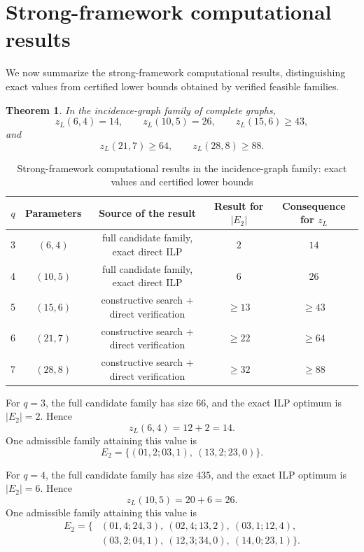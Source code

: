 \documentclass[10pt]{article}
\newcommand{\blue}[1]{#1}
\newcommand{\0}{\mathbf{0}}
\newcommand{\1}{\mathbf{1}}
\newtheorem{Thm}{Theorem}[section]
\begin{document}
\section{Strong-framework computational results}

\blue{We now summarize the strong-framework computational results, distinguishing exact values from certified lower bounds obtained by verified feasible families.}

\begin{Thm}
In the incidence-graph family of complete graphs,
\[
z_L(6,4)=14,\qquad z_L(10,5)=26,\qquad z_L(15,6)\ge 43,
\]
and
\[
z_L(21,7)\ge 64,\qquad z_L(28,8)\ge 88.
\]
\end{Thm}

\begin{table}[htbp]
\centering
\caption{Strong-framework computational results in the incidence-graph family: exact values and certified lower bounds}
\label{tab:smallq}
\begin{tabular}{|c|c|c|c|c|}
\hline
\(q\) & Parameters & Source of the result & Result for \(|E_2|\) & Consequence for \(z_L\) \\ \hline
3 & \((6,4)\) & full candidate family, exact direct ILP & \(2\) & \(14\) \\
4 & \((10,5)\) & full candidate family, exact direct ILP & \(6\) & \(26\) \\
5 & \((15,6)\) & constructive search + direct verification & \(\ge 13\) & \(\ge 43\) \\
6 & \((21,7)\) & constructive search + direct verification & \(\ge 22\) & \(\ge 64\) \\
7 & \((28,8)\) & constructive search + direct verification & \(\ge 32\) & \(\ge 88\) \\ \hline
\end{tabular}
\end{table}

For \(q=3\), the full candidate family has size \(66\), and the exact ILP optimum is \(|E_2|=2\). Hence
\[
z_L(6,4)=12+2=14.
\]
\blue{One admissible family attaining this value is}
\[
\blue{E_2=\{(01,2;03,1),\ (13,2;23,0)\}.}
\]

For \(q=4\), the full candidate family has size \(435\), and the exact ILP optimum is \(|E_2|=6\). Hence
\[
z_L(10,5)=20+6=26.
\]
\blue{One admissible family attaining this value is}
\[
\blue{\begin{aligned}
E_2=\{&(01,4;24,3),\ (02,4;13,2),\ (03,1;12,4),\\
&(03,2;04,1),\ (12,3;34,0),\ (14,0;23,1)\}.
\end{aligned}}
\]
\end{document}
